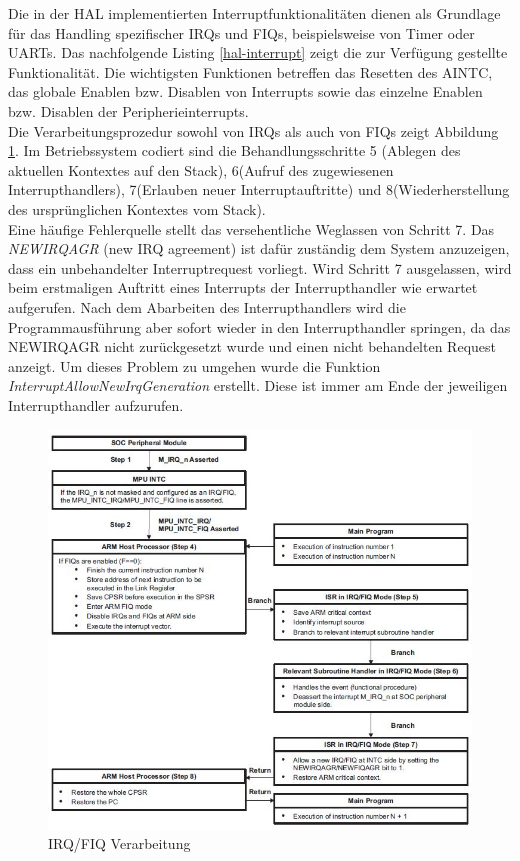 Die in der HAL implementierten Interruptfunktionalitäten dienen als Grundlage für das Handling spezifischer IRQs und FIQs, beispielsweise von Timer oder UARTs. Das nachfolgende Listing \ref{hal-interrupt} zeigt die zur Verfügung gestellte Funktionalität. Die wichtigsten Funktionen betreffen das Resetten des AINTC, das globale Enablen bzw. Disablen von Interrupts sowie das einzelne Enablen bzw. Disablen der Peripherieinterrupts.\\



Die Verarbeitungsprozedur sowohl von IRQs als auch von FIQs zeigt Abbildung \ref{fig:interruptProcedure}. Im Betriebssystem codiert sind die Behandlungsschritte 5 (Ablegen des aktuellen Kontextes auf den Stack), 6(Aufruf des zugewiesenen Interrupthandlers), 7(Erlauben neuer Interruptauftritte) und 8(Wiederherstellung des ursprünglichen Kontextes vom Stack).\\

Eine häufige Fehlerquelle stellt das versehentliche Weglassen von Schritt 7. Das \emph{NEWIRQAGR} (new IRQ agreement) ist dafür zuständig dem System anzuzeigen, dass ein unbehandelter Interruptrequest vorliegt. Wird Schritt 7 ausgelassen, wird beim erstmaligen Auftritt eines Interrupts der Interrupthandler wie erwartet aufgerufen. Nach dem Abarbeiten des Interrupthandlers wird die Programmausführung aber sofort wieder in den Interrupthandler springen, da das NEWIRQAGR nicht zurückgesetzt wurde und einen nicht behandelten Request anzeigt. Um dieses Problem zu umgehen wurde die Funktion \emph{InterruptAllowNewIrqGeneration} erstellt. Diese ist immer am Ende der jeweiligen Interrupthandler aufzurufen.

\begin{figure}[H]
	\includegraphics[scale=1]{chapters/hal/figures/interruptProcedure}
	\caption{IRQ/FIQ Verarbeitung \cite[S. 193]{ARM:TRM}}
	\label{fig:interruptProcedure}
\end{figure}


